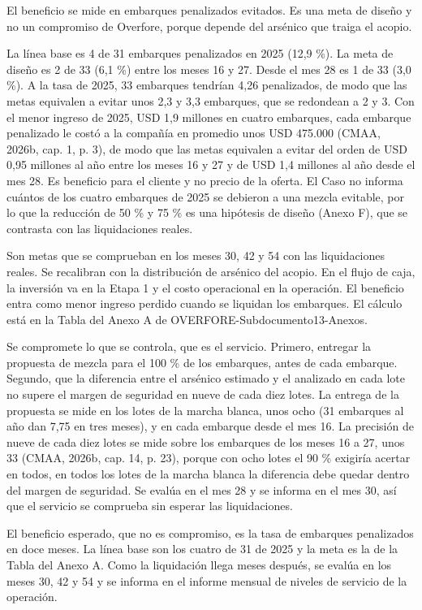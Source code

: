 \documentclass[subdoc]{../../comun/overfore}
\begin{document}
El beneficio se mide en embarques penalizados evitados. Es una meta de diseño y no un compromiso de Overfore, porque depende del arsénico que traiga el acopio.

La línea base es 4 de 31 embarques penalizados en 2025 (12,9 \%). La meta de diseño es 2 de 33 (6,1 \%) entre los meses 16 y 27. Desde el mes 28 es 1 de 33 (3,0 \%). A la tasa de 2025, 33 embarques tendrían 4,26 penalizados, de modo que las metas equivalen a evitar unos 2,3 y 3,3 embarques, que se redondean a 2 y 3. Con el menor ingreso de 2025, USD 1,9 millones en cuatro embarques, cada embarque penalizado le costó a la compañía en promedio unos USD 475.000 (CMAA, 2026b, cap. 1, p. 3), de modo que las metas equivalen a evitar del orden de USD 0,95 millones al año entre los meses 16 y 27 y de USD 1,4 millones al año desde el mes 28. Es beneficio para el cliente y no precio de la oferta. El Caso no informa cuántos de los cuatro embarques de 2025 se debieron a una mezcla evitable, por lo que la reducción de 50 \% y 75 \% es una hipótesis de diseño (Anexo F), que se contrasta con las liquidaciones reales.

Son metas que se comprueban en los meses 30, 42 y 54 con las liquidaciones reales. Se recalibran con la distribución de arsénico del acopio. En el flujo de caja, la inversión va en la Etapa 1 y el costo operacional en la operación. El beneficio entra como menor ingreso perdido cuando se liquidan los embarques. El cálculo está en la Tabla  del Anexo A de OVERFORE-Subdocumento13-Anexos.

Se compromete lo que se controla, que es el servicio. Primero, entregar la propuesta de mezcla para el 100 \% de los embarques, antes de cada embarque. Segundo, que la diferencia entre el arsénico estimado y el analizado en cada lote no supere el margen de seguridad en nueve de cada diez lotes. La entrega de la propuesta se mide en los lotes de la marcha blanca, unos ocho (31 embarques al año dan 7,75 en tres meses), y en cada embarque desde el mes 16. La precisión de nueve de cada diez lotes se mide sobre los embarques de los meses 16 a 27, unos 33 (CMAA, 2026b, cap. 14, p. 23), porque con ocho lotes el 90 \% exigiría acertar en todos, en todos los lotes de la marcha blanca la diferencia debe quedar dentro del margen de seguridad. Se evalúa en el mes 28 y se informa en el mes 30, así que el servicio se comprueba sin esperar las liquidaciones.

El beneficio esperado, que no es compromiso, es la tasa de embarques penalizados en doce meses. La línea base son los cuatro de 31 de 2025 y la meta es la de la Tabla  del Anexo A. Como la liquidación llega meses después, se evalúa en los meses 30, 42 y 54 y se informa en el informe mensual de niveles de servicio de la operación.
\end{document}
